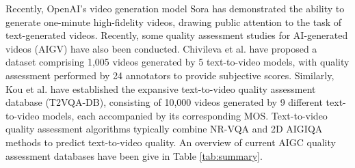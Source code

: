 Recently, OpenAI's video generation model Sora has demonstrated the ability to generate one-minute high-fidelity videos, drawing public attention to the task of text-generated videos. Recently, some quality assessment studies for AI-generated videos (AIGV) have also been conducted. Chivileva et al. \cite{chivileva2023measuring} have proposed a dataset comprising 1,005 videos generated by 5 text-to-video models, with quality assessment performed by 24 annotators to provide subjective scores. Similarly, Kou et al. \cite{kou2024subjective} have established the expansive text-to-video quality assessment database (T2VQA-DB), consisting of 10,000 videos generated by 9 different text-to-video models, each accompanied by its corresponding MOS. Text-to-video quality assessment algorithms typically combine NR-VQA and 2D AIGIQA methods to predict text-to-video quality. An overview of current AIGC quality assessment databases have been give in Table \ref{tab:summary}.


